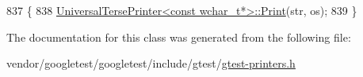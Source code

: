 \begin{DoxyCode}
837                                                   \{
838     \hyperlink{classtesting_1_1internal_1_1UniversalTersePrinter_a2e16ee42c9b18fca397cd95f32e8e879}{UniversalTersePrinter<const wchar\_t*>::Print}(str, os);
839   \}
\end{DoxyCode}


The documentation for this class was generated from the following file\+:\begin{DoxyCompactItemize}
\item 
vendor/googletest/googletest/include/gtest/\hyperlink{gtest-printers_8h}{gtest-\/printers.\+h}\end{DoxyCompactItemize}
